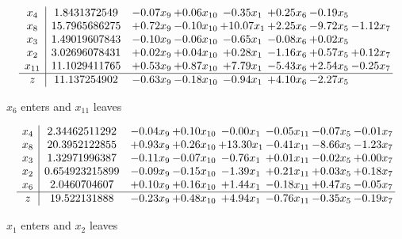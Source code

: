 \documentclass[9pt]{article}
\begin{document}
 \[\begin{array}{c| c c@{\hskip 2pt} c@{\hskip 2pt} c@{\hskip 2pt} c@{\hskip 2pt} c@{\hskip 2pt} c@{\hskip 2pt} }
 x_{4}   &  1.8431372549 & -0.07 x_{9} & +  0.06 x_{10} & -0.35 x_{1} & +  0.25 x_{6} & -0.19 x_{5} &   \\
 x_{8}   &  15.7965686275 & +  0.72 x_{9} & -0.10 x_{10} & + 10.07 x_{1} & +  2.25 x_{6} & -9.72 x_{5} & -1.12 x_{7}\\
 x_{3}   &  1.49019607843 & -0.10 x_{9} & -0.06 x_{10} & -0.65 x_{1} & -0.08 x_{6} & +  0.02 x_{5} &   \\
 x_{2}   &  3.02696078431 & +  0.02 x_{9} & +  0.04 x_{10} & +  0.28 x_{1} & -1.16 x_{6} & +  0.57 x_{5} & +  0.12 x_{7}\\
 x_{11}   &  11.1029411765 & +  0.53 x_{9} & +  0.87 x_{10} & +  7.79 x_{1} & -5.43 x_{6} & +  2.54 x_{5} & -0.25 x_{7}\\
\hline
z    &  11.137254902 & -0.63 x_{9} & -0.18 x_{10} & -0.94 x_{1} & +  4.10 x_{6} & -2.27 x_{5} &   \\
\end{array}\]


 $ x_{6} $ enters and $ x_{11} $ leaves 

 \[\begin{array}{c| c c@{\hskip 2pt} c@{\hskip 2pt} c@{\hskip 2pt} c@{\hskip 2pt} c@{\hskip 2pt} c@{\hskip 2pt} }
 x_{4}   &  2.34462511292 & -0.04 x_{9} & +  0.10 x_{10} & -0.00 x_{1} & -0.05 x_{11} & -0.07 x_{5} & -0.01 x_{7}\\
 x_{8}   &  20.3952122855 & +  0.93 x_{9} & +  0.26 x_{10} & + 13.30 x_{1} & -0.41 x_{11} & -8.66 x_{5} & -1.23 x_{7}\\
 x_{3}   &  1.32971996387 & -0.11 x_{9} & -0.07 x_{10} & -0.76 x_{1} & +  0.01 x_{11} & -0.02 x_{5} & +  0.00 x_{7}\\
 x_{2}   &  0.654923215899 & -0.09 x_{9} & -0.15 x_{10} & -1.39 x_{1} & +  0.21 x_{11} & +  0.03 x_{5} & +  0.18 x_{7}\\
 x_{6}   &  2.0460704607 & +  0.10 x_{9} & +  0.16 x_{10} & +  1.44 x_{1} & -0.18 x_{11} & +  0.47 x_{5} & -0.05 x_{7}\\
\hline
z    &  19.522131888 & -0.23 x_{9} & +  0.48 x_{10} & +  4.94 x_{1} & -0.76 x_{11} & -0.35 x_{5} & -0.19 x_{7}\\
\end{array}\]


 $ x_{1} $ enters and $ x_{2} $ leaves 
\end{document}
